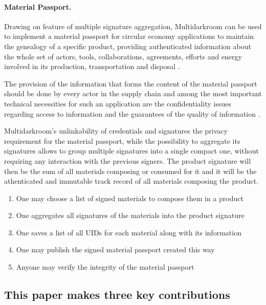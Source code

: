 \documentclass[twocolumn]{article}
\begin{document}
\paragraph*{Material Passport.}
Drawing on feature of multiple signature aggregation, Multidarkroom can
be used to implement a {material passport} for circular economy
applications \citep{material-passport} to maintain the genealogy of a
specific product, providing authenticated information about  the whole
set of actors, tools, collaborations, agreements, efforts and energy
involved in its production, transportation and disposal
\citep{reflow-os}.

The provision of the information that forms the content of the material
passport should be done by every actor in the supply chain and among the
most important technical necessities for such an application are the
confidentiality issues regarding access to information and the
guarantees of the quality of information \citep{resources-passport}.

Multidarkroom's unlinkability of credentials and signatures the privacy
requirement for the material passport, while the possibility to
aggregate its signatures allows to group multiple signatures into a
single compact one, without requiring any interaction with the previous
signers. The product signature will then be the sum of all materials
composing or consumed for it and it will be the athenticated and
immutable track record of all materials composing the product.

\begin{enumerate}
  \item One may choose a list of signed materials to compose them in a product
  \item One aggregates all signatures of the materials into the product signature
  \item One saves a list of all UIDs for each material along with its information
  \item One may publish the signed material passport created this way 
  \item Anyone may verify the integrity of the material passport
\end{enumerate}


\subsection*{This paper makes three key contributions}
\end{document}
